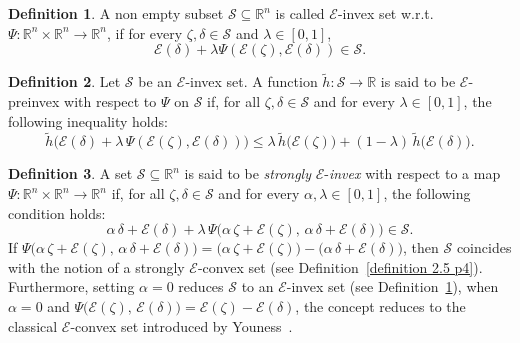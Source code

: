 \documentclass[12pt, reqno]{amsart}
\theoremstyle{definition}
\newtheorem{definition}{Definition}[section]
\theoremstyle{remark}
\numberwithin{equation}{section}
\begin{document}
  \begin{definition} \cite{Fulga} \label{definition 2.7 p4}
 	A non empty subset $ {\mathcal{S}}\subseteq  {\mathbb{R}^n}$ is called    $ {\mathcal{E}}$-invex set  w.r.t. $ {\Psi}: {\mathbb{R}^n}\times  {\mathbb{R}^n}\rightarrow {\mathbb{R}^n}$, if for every $\mathit{\zeta} ,\mathit{\delta} \in {\mathcal{S}}$ and $ {\lambda}\in  {[0,1]} $, 
 	$${\mathcal{E}} (\mathit{\delta} )+{\lambda}{\Psi}({\mathcal{E}}(\mathit{\zeta} ),{\mathcal{E}} (\mathit{\delta} ))\in {\mathcal{S}}.$$ 
 \end{definition}
 \begin{definition} \cite{Fulga}\label{definition 2.8 p4}
 	 \noindent
Let $\mathcal{S}$ be an $\mathcal{E}$-invex set. A function $\tilde{h} : \mathcal{S} \rightarrow \mathbb{R}$ is said to be $\mathcal{E}$-preinvex with respect to $\Psi$ on $\mathcal{S}$ if, for all $\zeta, \delta \in \mathcal{S}$ and for every $\lambda \in [0,1]$, the following inequality holds:
\[
\tilde{h}\big(\mathcal{E}(\delta) + \lambda\, \Psi(\mathcal{E}(\zeta), \mathcal{E}(\delta))\big)
\leq \lambda\, \tilde{h}\big(\mathcal{E}(\zeta)\big) + (1 - \lambda)\, \tilde{h}\big(\mathcal{E}(\delta)\big).
\]

 \end{definition}

 \begin{definition}\label{definition 2.9 p4} \cite{Iqbal2022}
  	\noindent
A set $\mathcal{S} \subseteq \mathbb{R}^n$ is said to be \emph{strongly} $\mathcal{E}$-\emph{invex} with respect to a map $\Psi : \mathbb{R}^n \times \mathbb{R}^n \rightarrow \mathbb{R}^n$ if, for all $\zeta, \delta \in \mathcal{S}$ and for every $\alpha, \lambda \in [0,1]$, the following condition holds:
\[
\alpha\, \delta + \mathcal{E}(\delta) + \lambda\, \Psi\big(\alpha\, \zeta + \mathcal{E}(\zeta),\, \alpha\, \delta + \mathcal{E}(\delta)\big) \in \mathcal{S}.
\]
If $\Psi\big(\alpha\, \zeta + \mathcal{E}(\zeta),\, \alpha\, \delta + \mathcal{E}(\delta)\big) = \big(\alpha\, \zeta + \mathcal{E}(\zeta)\big) - \big(\alpha\, \delta + \mathcal{E}(\delta)\big)$, then $\mathcal{S}$ coincides with the notion of a strongly $\mathcal{E}$-convex set (see Definition~\ref{definition 2.5 p4}). Furthermore, setting $\alpha = 0$ reduces $\mathcal{S}$ to an $\mathcal{E}$-invex set (see Definition~\ref{definition 2.7 p4}), when $\alpha = 0$ and $\Psi\big(\mathcal{E}(\zeta),\, \mathcal{E}(\delta)\big) = \mathcal{E}(\zeta) - \mathcal{E}(\delta)$, the concept reduces to the classical $\mathcal{E}$-convex set introduced by Youness~\cite{Youness2001a}.

  \end{definition}
\end{document}
